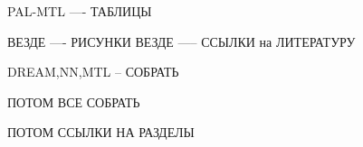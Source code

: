 PAL-MTL ---- ТАБЛИЦЫ

ВЕЗДЕ ---- РИСУНКИ
ВЕЗДЕ ----- ССЫЛКИ на ЛИТЕРАТУРУ

DREAM,NN,MTL -- СОБРАТЬ

ПОТОМ ВСЕ СОБРАТЬ

ПОТОМ ССЫЛКИ НА РАЗДЕЛЫ